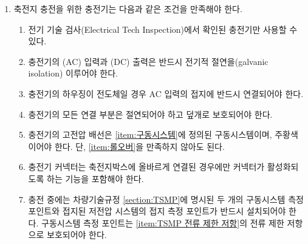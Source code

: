 \documentclass[final,a4paper,10pt]{report}
\begin{document}
\begin{enumerate}
  \item\label{rule:formula-technical.ts-maintenance-charging.charger-conditions} 축전지 충전을 위한 충전기는 다음과 같은 조건을 만족해야 한다.
    \begin{enumerate}
      \item\label{rule:formula-technical.ts-maintenance-charging.charger-conditions.inspection-verified-charger} 전기 기술 검사(Electrical Tech Inspection)에서 확인된 충전기만 사용할 수 있다.
      \item\label{rule:formula-technical.ts-maintenance-charging.charger-conditions.ac-dc-galvanic-isolation} 충전기의 (AC) 입력과 (DC) 출력은 반드시 전기적 절연을(galvanic isolation) 이루어야 한다.
      \item\label{rule:formula-technical.ts-maintenance-charging.charger-conditions.conductive-housing-grounding} 충전기의 하우징이 전도체일 경우 AC 입력의 접지에 반드시 연결되어야 한다.
      \item\label{rule:formula-technical.ts-maintenance-charging.charger-conditions.insulated-and-covered-connections} 충전기의 모든 연결 부분은 절연되어야 하고 덮개로 보호되어야 한다.
      \item\label{rule:formula-technical.ts-maintenance-charging.charger-conditions.orange-hv-wiring} 충전기의 고전압 배선은 \ref{item:구동시스템}에 정의된 구동시스템이며, 주황색이어야 한다. 단, \ref{item:롤오버}을 만족하지 않아도 된다.
      \item\label{rule:formula-technical.ts-maintenance-charging.charger-conditions.connector-activation-interlock} 충전기 커넥터는 축전지박스에 올바르게 연결된 경우에만 커넥터가 활성화되도록 하는 기능을 포함해야 한다.
      \item\label{rule:formula-technical.ts-maintenance-charging.charger-conditions.measuring-points-during-charging} 충전 중에는 차량기술규정 \ref{section:TSMP}에 명시된 두 개의 구동시스템 측정 포인트와 접지된 저전압 시스템의 접지 측정 포인트가 반드시 설치되어야 한다. 구동시스템 측정 포인트는 \ref{item:TSMP 전류 제한 저항}의 전류 제한 저항으로 보호되어야 한다.
    \end{enumerate}


\end{enumerate}
\end{document}
